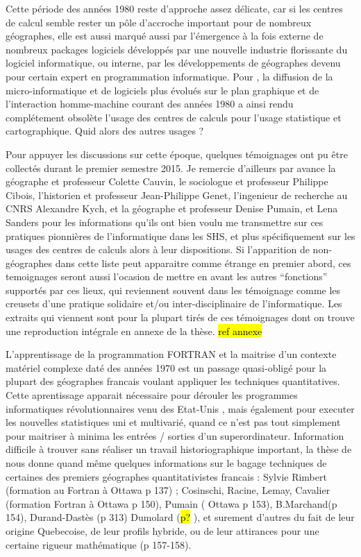 Cette période des années 1980 reste d'approche assez délicate, car si les centres de calcul semble rester un pôle d'accroche important pour de nombreux géographes, elle est aussi marqué aussi par l’émergence à la fois externe de nombreux packages logiciels développés par une nouvelle industrie florissante du logiciel informatique, ou interne, par les développements de géographes devenu pour certain expert en programmation informatique. Pour \autocites[444]{Joliveau2004}{Waniez2010}, la diffusion de la micro-informatique et de logiciels plus évolués sur le plan graphique et de l’interaction homme-machine courant des années 1980 a ainsi rendu complétement obsolète l’usage des centres de calculs pour l’usage statistique et cartographique. Quid alors des autres usages ?

Pour appuyer les discussions sur cette époque, quelques témoignages ont pu être collectés durant le premier semestre 2015. Je remercie d'ailleurs par avance la géographe et professeur Colette Cauvin, le sociologue et professeur Philippe Cibois, l'historien et professeur Jean-Philippe Genet, l'ingenieur de recherche au CNRS Alexandre Kych, et la géographe et professeur Denise Pumain, et Lena Sanders pour les informations qu'ils ont bien voulu me transmettre sur ces pratiques pionnières de l'informatique dans les SHS, et plus spécifiquement sur les usages des centres de calculs alors à leur dispositions. Si l'apparition de non-géographes dans cette liste peut apparaitre comme étrange en premier abord, ces temoignages seront aussi l'ocasion de mettre en avant les autres \enquote{fonctions} supportés par ces lieux, qui reviennent souvent dans les témoignage comme les creusets d'une pratique solidaire et/ou inter-disciplinaire de l'informatique. Les extraits qui viennent sont pour la plupart tirés de ces témoignages dont on trouve une reproduction intégrale en annexe de la thèse. \hl{ref annexe}

L'apprentissage de la programmation FORTRAN et la maitrise d'un contexte matériel complexe daté des années 1970 est un passage quasi-obligé pour la plupart des géographes francais voulant appliquer les techniques quantitatives. Cette aprentissage apparait nécessaire pour dérouler les programmes informatiques révolutionnaires venu des Etat-Unis \autocite[150,127]{Cuyala2014}, mais également pour executer les nouvelles statistiques uni et multivarié, quand ce n’est pas tout simplement pour maitriser à minima les entrées / sorties d’un superordinateur. Information difficile à trouver sans réaliser un travail historiographique important, la thèse de \textcite{Cuyala2014} nous donne quand même quelques informations sur le bagage techniques de certaines des premiers géographes quantitativistes francais : Sylvie Rimbert (formation au Fortran à Ottawa p 137) ;  Cosinschi, Racine, Lemay, Cavalier (formation Fortran à Ottawa p 150), Pumain ( Ottawa p 153), B.Marchand(p 154), Durand-Dastès (p 313) Dumolard (\hl{p?} ), et surement d’autres du fait de leur origine Quebecoise, de leur profils hybride, ou de leur attirances pour une certaine rigueur mathématique (p 157-158). 

